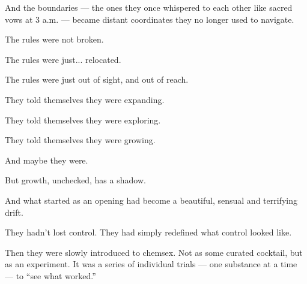And the boundaries --- the ones they once whispered to each other like sacred vows at 
3 a.m. --- became distant coordinates they no longer used to navigate.

The rules were not broken.

The rules were just... relocated.

The rules were just out of sight, and out of reach.

They told themselves they were expanding. 

They told themselves they were exploring. 

They told themselves they were growing.

And maybe they were.

But growth, unchecked, has a shadow.

And what started as an opening had become a beautiful, sensual and terrifying drift.

They hadn’t lost control.
They had simply redefined what control looked like.

Then they were slowly introduced to chemsex. Not as some curated cocktail, but as an experiment. 
It was a series of individual trials --- one substance at a time --- to ``see what worked.'' 

\medskip

